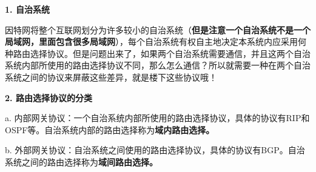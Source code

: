 {\textbf{1. 自治系统}}

因特网将整个互联网划分为许多较小的自治系统（\textbf{但是注意一个自治系统不是一个局域网，里面包含很多局域网}），每个自治系统有权自主地决定本系统内应采用何种路由选择协议。但是问题出来了，如果两个自治系统需要通信，并且这两个自治系统内部所使用的路由选择协议不同，那么怎么通信？所以就需要一种{在两个自治系统之间的协议}{来屏蔽这些差异，就是楼下这些协议哦！}

{\textbf{2. 路由选择协议的分类}}

a.
内部网关协议：一个自治系统内部所使用的路由选择协议，{具体的协议有RIP和OSPF等。{自治系统内部的路由选择称为}{{\textbf{域内路由选择}}\textbf{。}}}

b.
外部网关协议：自治系统之间使用的路由选择协议，{具体的协议有BGP。{自治系统之间的路由选择称为}{\textbf{域间路由选择}}{\textbf{。}}}
